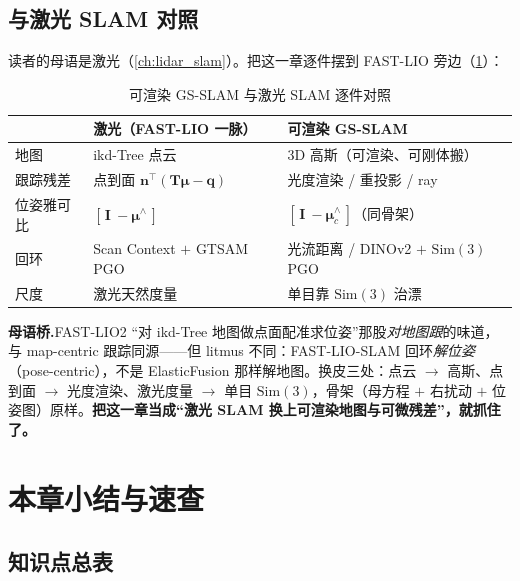 \subsection{与激光 SLAM 对照}

读者的母语是激光（\cref{ch:lidar_slam}）。把这一章逐件摆到 FAST-LIO 旁边（\cref{tab:gs-lidar}）：

\begin{table}[H]\centering
\caption{可渲染 GS-SLAM 与激光 SLAM 逐件对照}
\label{tab:gs-lidar}
\small
\begin{tabular}{@{}lll@{}}
\toprule
 & 激光（FAST-LIO 一脉）& 可渲染 GS-SLAM \\
\midrule
地图 & ikd-Tree 点云 & 3D 高斯（可渲染、可刚体搬）\\
跟踪残差 & 点到面 $\mathbf n^\top(\mathbf T\boldsymbol\mu-\mathbf q)$ & 光度渲染 / 重投影 / ray \\
位姿雅可比 & $[\,\mathbf I\ -\boldsymbol\mu^\wedge\,]$ & $[\,\mathbf I\ -\boldsymbol\mu_c^\wedge\,]$（同骨架）\\
回环 & Scan Context $+$ GTSAM PGO & 光流距离 / DINOv2 $+$ $\mathrm{Sim}(3)$ PGO \\
尺度 & 激光天然度量 & 单目靠 $\mathrm{Sim}(3)$ 治漂 \\
\bottomrule
\end{tabular}
\end{table}

\begin{note}
\textbf{母语桥.}\;FAST-LIO2 “对 ikd-Tree 地图做点面配准求位姿”那股\emph{对地图跟}的味道，与 map-centric 跟踪同源——但 litmus 不同：FAST-LIO-SLAM 回环\emph{解位姿}（pose-centric），不是 ElasticFusion 那样解地图。换皮三处：点云 $\to$ 高斯、点到面 $\to$ 光度渲染、激光度量 $\to$ 单目 $\mathrm{Sim}(3)$，骨架（母方程 $+$ 右扰动 $+$ 位姿图）原样。\textbf{把这一章当成“激光 SLAM 换上可渲染地图与可微残差”，就抓住了。}
\end{note}

\section{本章小结与速查}
\label{sec:gs-summary}

\subsection{知识点总表}

